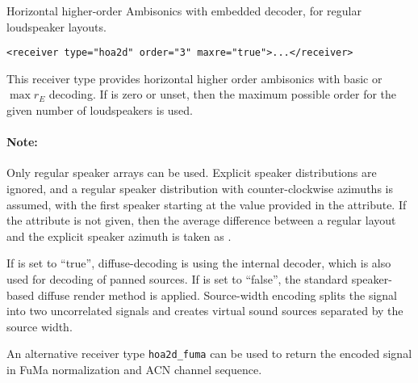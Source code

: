 Horizontal higher-order Ambisonics with embedded decoder, for regular
loudspeaker layouts.

\begin{lstlisting}[numbers=none]
<receiver type="hoa2d" order="3" maxre="true">...</receiver>
\end{lstlisting}

This receiver type provides horizontal higher order ambisonics with
basic or $\max r_E$ decoding.
%
If  is zero or unset, then the maximum possible order for
the given number of loudspeakers is used.



\paragraph{Note:}
Only regular speaker arrays can be used. Explicit speaker
distributions are ignored, and a regular speaker distribution with
counter-clockwise azimuths is assumed, with the first speaker starting
at the value provided in the  attribute.
%
If the  attribute is not given, then the average
difference between a regular layout and the explicit speaker azimuth
is taken as .

If  is set to ``true'', diffuse-decoding is using the
internal decoder, which is also used for decoding of panned sources.
%
If  is set to ``false'', the standard speaker-based
diffuse render method is applied.
%
Source-width encoding splits the signal into two uncorrelated signals
and creates virtual sound sources separated by the source width.

An alternative receiver type \verb!hoa2d_fuma! can be used to return
the encoded signal in FuMa normalization and ACN channel sequence.
